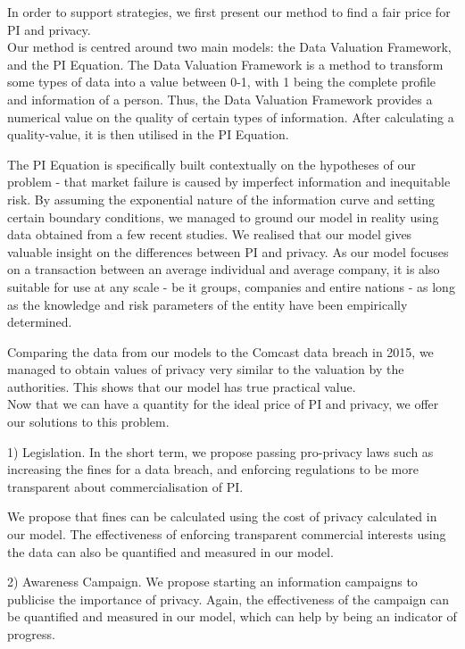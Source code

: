 \documentclass{icmmcm}
\begin{document}
In order to support strategies, we first present our method to find a fair price for PI and privacy.\\

Our method is centred around two main models: the Data Valuation Framework, and the PI Equation. The Data Valuation Framework is a method to transform some types of data into a value between 0-1, with 1 being the complete profile and information of a person. Thus, the Data Valuation Framework provides a numerical value on the quality of certain types of information. After calculating a quality-value, it is then utilised in the PI Equation.

The PI Equation is specifically built contextually on the hypotheses of our problem - that market failure is caused by imperfect information and inequitable risk. By assuming the exponential nature of the information curve and setting certain boundary conditions, we managed to ground our model in reality using data obtained from a few recent studies. We realised that  our  model  gives  valuable insight  on  the  differences  between  PI  and privacy. As our model focuses on a transaction between an average individual and average company, it is also suitable for use at any scale - be it groups, companies and entire nations - as long as the knowledge and risk parameters of the entity have been empirically determined.

Comparing the data from our models to the Comcast data breach in 2015, we managed to obtain values of privacy very similar to the valuation by the authorities. This shows that our model has true practical value. \\


Now that we can have a quantity for the ideal price of PI and privacy, we offer our solutions to this problem.

1) Legislation. In the short term, we propose passing pro-privacy laws such as increasing the fines for a data breach, and enforcing regulations to be more transparent about commercialisation of PI.

We propose that fines can be calculated using the cost of privacy calculated in our model. The effectiveness of enforcing transparent commercial interests using the data can also be quantified and measured in our model.

2) Awareness Campaign. We propose starting an information campaigns to publicise the importance of privacy. Again, the effectiveness of the campaign can be quantified and measured in our model, which can help by being an indicator of progress.
\end{document}
